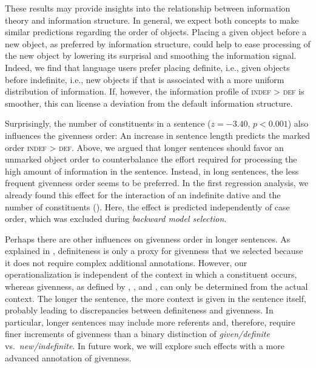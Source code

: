 \documentclass[output=paper,colorlinks,citecolor=brown]{langscibook}
\begin{document}
These results may provide insights into the relationship between information theory and information structure. In general, we expect both concepts to make similar predictions regarding the order of objects. Placing a given object before a new object, as preferred by information structure, could help to ease processing of the new object by lowering its surprisal and smoothing the information signal. Indeed, we find that language users prefer placing definite, i.e., given objects before indefinite, i.e., new objects if that is associated with a more uniform distribution of information. If, however, the information profile of \textsc{indef > def} is smoother, this can license a deviation from the default information structure.

Surprisingly, the number of constituents in a sentence ($z=-3.40$, $p<0.001$) also influences the givenness order: An increase in sentence length predicts the marked order \textsc{indef > def}. 
Above, we argued that longer sentences should favor an unmarked object order to counterbalance the effort required for processing the high amount of information in the sentence. Instead, in long sentences, the less frequent givenness order seems to be preferred. 
In the first regression analysis, we already found this effect for the interaction of an indefinite dative and the number of constituents (). Here, the effect is predicted independently of case order, which was excluded during \textit{backward model selection}.

Perhaps there are other influences on givenness order in longer sentences. As explained in , definiteness is only a proxy for givenness that we selected because it does not require complex additional annotations. However, our operationalization is independent of the context in which a constituent occurs, whereas givenness, as defined by \citet{Prince}, \citet{Gundel}, and \citet{Riester.Baumann}, can only be determined from the actual context. The longer the sentence, the more context is given in the sentence itself, probably leading to discrepancies between definiteness and givenness. In particular, longer sentences may include more referents and, therefore, require finer increments of givenness than a binary distinction of \textit{given/definite} vs.\ \textit{new/indefinite}. In future work, we will explore such effects with a more advanced annotation of givenness.
\end{document}
